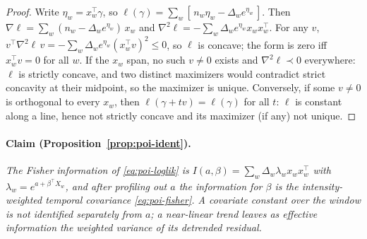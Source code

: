 \begin{proof}
Write $\eta_w = x_w^\top \gamma$, so $\ell(\gamma) = \sum_w [\, n_w \eta_w - \Delta_w e^{\eta_w}
\,]$. Then $\nabla \ell = \sum_w (n_w - \Delta_w e^{\eta_w})\, x_w$ and $\nabla^2 \ell = -\sum_w
\Delta_w e^{\eta_w} x_w x_w^\top$. For any $v$, $v^\top \nabla^2 \ell\, v = -\sum_w \Delta_w
e^{\eta_w} (x_w^\top v)^2 \le 0$, so $\ell$ is concave; the form is zero iff $x_w^\top v = 0$ for
all $w$. If the $x_w$ span, no such $v \ne 0$ exists and $\nabla^2 \ell \prec 0$ everywhere: $\ell$
is strictly concave, and two distinct maximizers would contradict strict concavity at their
midpoint, so the maximizer is unique. Conversely, if some $v \ne 0$ is orthogonal to every $x_w$,
then $\ell(\gamma + t v) = \ell(\gamma)$ for all $t$: $\ell$ is constant along a line, hence not
strictly concave and its maximizer (if any) not unique.
\end{proof}

\paragraph{Claim (Proposition~\ref{prop:poi-ident}).}
\emph{The Fisher information of \eqref{eq:poi-loglik} is $I(a, \beta) = \sum_w \Delta_w \lambda_w
x_w x_w^\top$ with $\lambda_w = e^{a + \beta^\top X_w}$, and after profiling out $a$ the information
for $\beta$ is the intensity-weighted temporal covariance \eqref{eq:poi-fisher}. A covariate
constant over the window is not identified separately from $a$; a near-linear trend leaves as
effective information the weighted variance of its detrended residual.}

